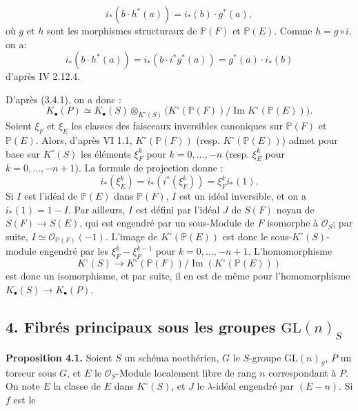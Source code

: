 \[
i_*(b\cdot h^*(a))=i_*(b)\cdot g^*(a),
\]
où $g$ et $h$
sont les morphismes structuraux de $\mathbb P(F)$ et $\mathbb P(E)$. Comme $h=g\circ i$, on a:
\[
i_*(b\cdot h^*(a))=i_*(b\cdot i^*g^*(a))=g^*(a)\cdot i_*(b)
\]
d'après IV 2.12.4.

D'après (3.4.1), on a donc :
\[
K_\bullet(P)\simeq K_\bullet(S)\otimes_{K^\circ(S)}
\bigl(K^\circ(\mathbb P(F))/\operatorname{Im}K^\circ(\mathbb P(E))\bigr).
\]
Soient $\xi_F$ et $\xi_E$ les classes des faisceaux inversibles canoniques sur $\mathbb P(F)$ et $\mathbb P(E)$. Alors, d'après VI 1.1, $K^\circ(\mathbb P(F))$ (resp. $K^\circ(\mathbb P(E))$) admet pour base sur $K^\circ(S)$ les éléments $\xi_F^k$ pour $k=0,\ldots,-n$ (resp. $\xi_E^k$ pour $k=0,\ldots,-n+1$). La formule de projection donne :
\[
i_*(\xi_E^k)=i_*(i^*(\xi_F^k))=\xi_F^k i_*(1).
\]
Si $I$ est l'idéal de $\mathbb P(E)$ dans $\mathbb P(F)$, $I$ est un idéal inversible, et on a $i_*(1)=1-I$. Par ailleurs, $I$ est défini par l'idéal $J$ de $S(F)$ noyau de $S(F)\to S(E)$, qui est engendré par un sous-Module de $F$ isomorphe à $\mathcal O_S$; par suite, $I\simeq \mathcal O_{\mathbb P(F)}(-1)$. L'image de $K^\circ(\mathbb P(E))$ est donc le sous-$K^\circ(S)$-module engendré par les $\xi_F^k-\xi_F^{k-1}$ pour $k=0,\ldots,-n+1$. L'homomorphisme
\[
K^\circ(S)\longrightarrow K^\circ(\mathbb P(F))/\operatorname{Im}(K^\circ(\mathbb P(E)))
\]
est donc un isomorphisme, et par suite, il en est de même pour l'homomorphisme $K_\bullet(S)\to K_\bullet(P)$.

\subsection*{4. Fibrés principaux sous les groupes $\mathrm{GL}(n)_S$}

\textbf{Proposition 4.1.} Soient $S$ un schéma noethérien, $G$ le $S$-groupe $\mathrm{GL}(n)_S$, $P$ un torseur sous $G$, et $E$ le $\mathcal O_S$-Module localement libre de rang $n$ correspondant à $P$. On note $E$ la classe de $E$ dans $K^\circ(S)$, et $J$ le $\lambda$-idéal engendré par $(E-n)$. Si $f$ est le
